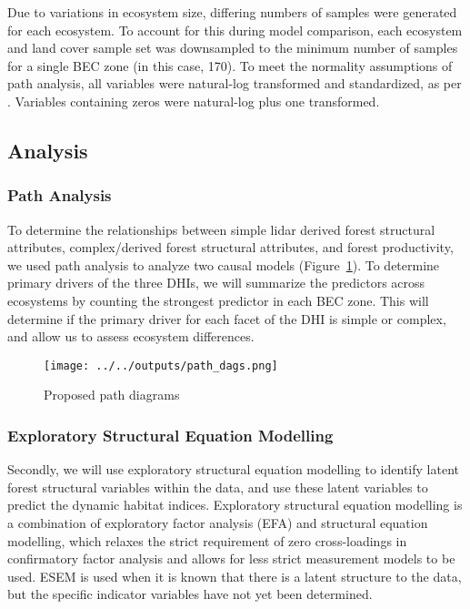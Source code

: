 \documentclass[
  authoryear,
  review,
  3p,
  twocolumn]{elsarticle}
\begin{document}
Due to variations in ecosystem size, differing numbers of samples were
generated for each ecosystem. To account for this during model
comparison, each ecosystem and land cover sample set was downsampled to
the minimum number of samples for a single BEC zone (in this case, 170).
To meet the normality assumptions of path analysis, all variables were
natural-log transformed and standardized, as per \citet{grace2016}.
Variables containing zeros were natural-log plus one transformed.

\hypertarget{analysis}{%
\subsection{Analysis}\label{analysis}}

\hypertarget{path-analysis}{%
\subsubsection{Path Analysis}\label{path-analysis}}

To determine the relationships between simple lidar derived forest
structural attributes, complex/derived forest structural attributes, and
forest productivity, we used path analysis to analyze two causal models
(Figure~\ref{fig-pathdag}). To determine primary drivers of the three
DHIs, we will summarize the predictors across ecosystems by counting the
strongest predictor in each BEC zone. This will determine if the primary
driver for each facet of the DHI is simple or complex, and allow us to
assess ecosystem differences.

\begin{figure}

{\centering \texttt{[image: ../../outputs/path\_dags.png]}

}

\caption{\label{fig-pathdag}Proposed path diagrams}

\end{figure}

\hypertarget{exploratory-structural-equation-modelling}{%
\subsubsection{Exploratory Structural Equation
Modelling}\label{exploratory-structural-equation-modelling}}

Secondly, we will use exploratory structural equation modelling
\citep{marsh2020, asparouhov2009} to identify latent forest structural
variables within the data, and use these latent variables to predict the
dynamic habitat indices. Exploratory structural equation modelling is a
combination of exploratory factor analysis (EFA) and structural equation
modelling, which relaxes the strict requirement of zero cross-loadings
in confirmatory factor analysis and allows for less strict measurement
models to be used. ESEM is used when it is known that there is a latent
structure to the data, but the specific indicator variables have not yet
been determined.
\end{document}
